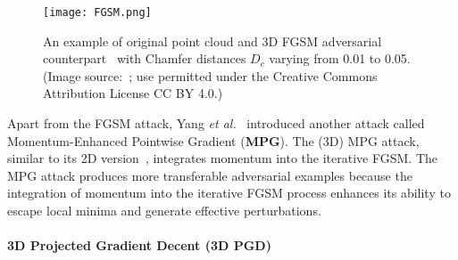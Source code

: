 \documentclass{ieeeaccess}
\def\etal{\textit{et al.}}
\begin{document}
\begin{figure*}
    \centering
    \texttt{[image: FGSM.png]}
    \caption{An example of original point cloud and 3D FGSM adversarial counterpart~\cite{yang2019adversarial} with Chamfer distances $D_c$ varying from 0.01 to 0.05. (Image source:~\cite{yang2019adversarial}; use permitted under the Creative Commons Attribution License CC BY 4.0.)}
    \label{fig_FGSM}
\end{figure*}
Apart from the FGSM attack, Yang \etal~\cite{yang2019adversarial} introduced another attack called Momentum-Enhanced Pointwise Gradient (\textbf{MPG}). The (3D) MPG attack, similar to its 2D version~\cite{dong2018boosting}, integrates momentum into the iterative FGSM. The MPG attack produces more transferable adversarial examples because the integration of momentum into the iterative FGSM process enhances its ability to escape local minima and generate effective perturbations.



\paragraph{3D Projected Gradient Decent (3D PGD)}
\label{subsubsubsec:PGD}
\end{document}
